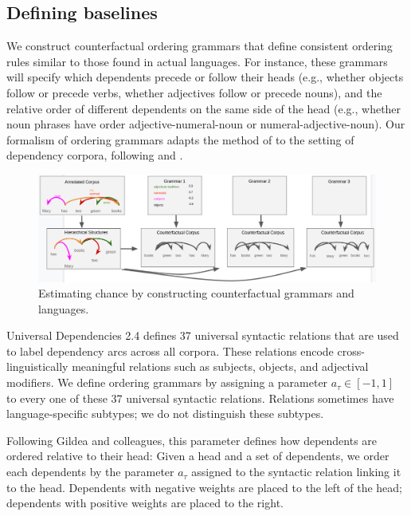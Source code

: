\subsection{Defining baselines}

We construct counterfactual ordering grammars that define consistent ordering rules similar to those found in actual languages.
For instance, these grammars will specify which dependents precede or follow their heads (e.g., whether objects follow or precede verbs, whether adjectives follow or precede nouns), and the relative order of different dependents on the same side of the head (e.g., whether noun phrases have order adjective-numeral-noun or numeral-adjective-noun). Our formalism of ordering grammars adapts the method of \citet{gildea-optimizing-2007,gildea-grammars-2010,gildea-human-2015} to the setting of dependency corpora, following \citet{futrell-large-scale-2015} and \citet{hahn2020optimization}.


\begin{figure}
\centering
\includegraphics[width=\textwidth]{figures-gdrive/counterfactual-languages.png}
	\caption{ Estimating chance by constructing counterfactual grammars and languages.}\label{fig:grammars}
\end{figure}


Universal Dependencies 2.4 defines 37 universal syntactic relations that are used to label dependency arcs across all corpora.
These relations encode cross-linguistically meaningful relations such as subjects, objects, and adjectival modifiers.
We define ordering grammars by assigning a parameter $a_\tau \in [-1,1]$ to every one of these 37 universal syntactic relations.
Relations sometimes have language-specific subtypes; we do not distinguish these subtypes.

Following Gildea and colleagues, this parameter defines how dependents are ordered relative to their head:
Given a head and a set of dependents, we order each dependents by the parameter $a_\tau$ assigned to the syntactic relation linking it to the head.
Dependents with negative weights are placed to the left of the head; dependents with positive weights are placed to the right.

